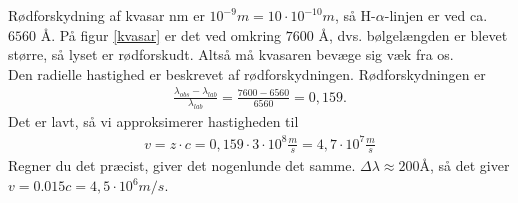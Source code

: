 \begin{opgave}{Rødforskydning af kvasar}
	\opg nm er $10^{-9} m= 10 \cdot 10^{-10} m$, så H-$\alpha$-linjen er ved ca. $6560$ Å. På figur \ref{kvasar} er det ved omkring $7600$ Å, dvs. bølgelængden er blevet større, så lyset er rødforskudt. Altså må kvasaren bevæge sig væk fra os.\\
	\opg Den radielle hastighed er beskrevet af rødforskydningen. Rødforskydningen er
	\begin{align}
		\frac{\lambda_{obs}-\lambda_{lab}}{\lambda_{lab}} = \frac{7600-6560}{6560} = 0,159.
	\end{align}
	Det er lavt, så vi approksimerer hastigheden til
	\begin{align}
		v= z\cdot c = 0,159 \cdot 3\cdot 10^8 \frac{m}{s}= 4,7\cdot 10^7 \frac{m}{s}
	\end{align}
	Regner du det præcist, giver det nogenlunde det samme.
	\opg $\Delta\lambda \approx 200 Å$, så det giver $v=0.015 c = 4,5\cdot 10^6 m/s$.
\end{opgave}
